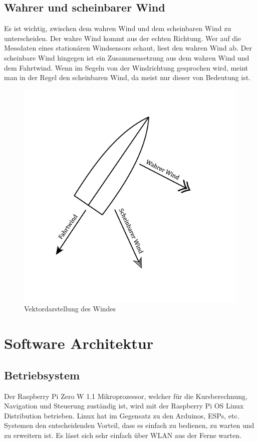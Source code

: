 \subsection{Wahrer und scheinbarer Wind}
Es ist wichtig, zwischen dem wahren Wind und dem scheinbaren Wind zu unterscheiden. Der wahre Wind kommt aus der echten Richtung. Wer auf die Messdaten eines stationären Windsensors schaut, liest den wahren Wind ab. Der scheinbare Wind hingegen ist ein Zusammensetzung aus dem wahren Wind und dem Fahrtwind. Wenn im Segeln von der Windrichtung gesprochen wird, meint man in der Regel den scheinbaren Wind, da meist nur dieser von Bedeutung ist.
\begin{figure}
    \centering
    \includegraphics[width=0.75\linewidth]{assets/scheinbarerwind.png}
    \caption{Vektordarstellung des Windes}
    
\end{figure}

\section{Software Architektur}
\subsection*{Betriebsystem}
Der Raspberry Pi Zero W 1.1 Mikroprozessor, welcher für die  Kursberechnung, Navigation und Steuerung zuständig ist, wird mit der Raspberry Pi OS Linux Distribution betrieben. Linux hat im Gegensatz zu den  Arduinos, ESPs, etc. Systemen den entscheidenden Vorteil, dass es einfach zu bedienen, zu warten und zu erweitern ist. Es lässt sich sehr einfach über WLAN aus der Ferne warten.
